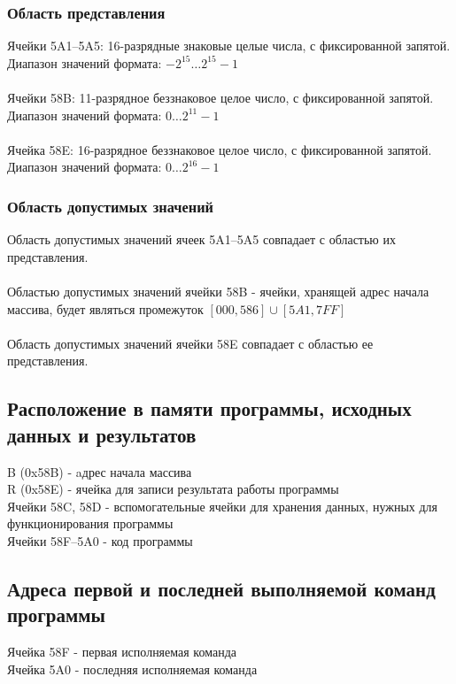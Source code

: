 \subsubsection{Область представления}
\noindent Ячейки 5A1--5A5: 16-разрядные знаковые целые числа, с фиксированной запятой. Диапазон значений формата: $-2^{15}\ldots2^{15}-1$\\
\\
Ячейки 58B: 11-разрядное беззнаковое целое число, с фиксированной запятой. Диапазон значений формата: $0\ldots2^{11} - 1$\\
\\
Ячейка 58E: 16-разрядное беззнаковое целое число, с фиксированной запятой. Диапазон значений формата: $0\ldots2^{16} - 1$\\


\subsubsection{Область допустимых значений}
\noindent Область допустимых значений ячеек 5A1--5A5 совпадает с областью их представления.\\
\\
Областью допустимых значений ячейки 58B - ячейки, хранящей адрес начала массива, будет являться промежуток $[000, 586]\cup[5A1,7FF]$\\
\\
Область допустимых значений ячейки 58E совпадает с областью ее представления.\\

\subsection{Расположение в памяти программы, исходных данных и результатов}
\noindent 	B (0x58B) - aдрес начала массива\\
R (0x58E) - ячейка для записи результата работы программы\\
Ячейки 58C, 58D - вспомогательные ячейки для хранения данных, нужных для функционирования программы\\
Ячейки 58F--5A0 - код программы\\

\subsection{Адреса первой и последней выполняемой команд программы}
\noindent Ячейка 58F - первая исполняемая команда\\
Ячейка 5A0 - последняя исполняемая команда\\


